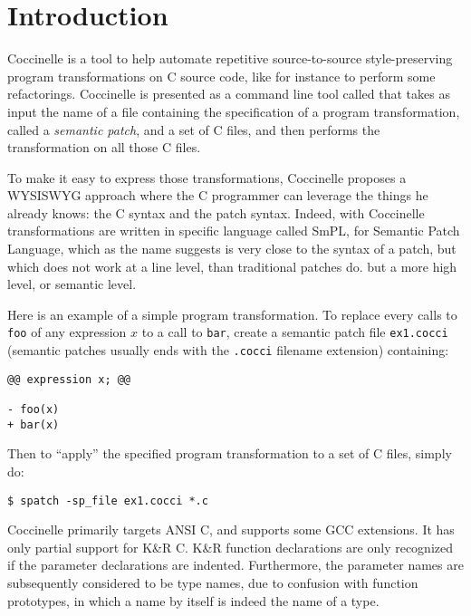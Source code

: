 \chapter{Introduction}

Coccinelle is a tool to help automate repetitive 
source-to-source style-preserving program transformations
on C source code, like for instance to perform some refactorings.
Coccinelle is presented as a command line tool called \spatch that takes
as input the name of a file containing the specification of a program
transformation, called a {\em semantic patch}, and a set of C files,
and then performs the transformation on all those C files.

To make it easy to express those transformations,
Coccinelle proposes a WYSISWYG approach where the C programmer 
can leverage the things he already knows: the C syntax
and the patch syntax. Indeed, with Coccinelle transformations
are written in specific language called SmPL, for 
Semantic Patch Language, which as the name suggests is very
close to the syntax of a patch, but which does not 
work at a line level, than traditional patches do.
but a more high level, or semantic level.

Here is an example of a simple program transformation.
To replace every calls to \verb+foo+ of any expression $x$ 
to a call to \verb+bar+, create a semantic patch file \verb+ex1.cocci+
(semantic patches usually ends with the \verb+.cocci+  filename extension)
containing:
\begin{verbatim}
@@ expression x; @@

- foo(x)
+ bar(x)

\end{verbatim}

Then to ``apply'' the specified program transformation to a set of C files,
simply do:
\begin{verbatim}
$ spatch -sp_file ex1.cocci *.c
\end{verbatim}


Coccinelle primarily targets ANSI C, and supports some GCC extensions.  It
has only partial support for K\&R C.  K\&R function declarations are only
recognized if the parameter declarations are indented.  Furthermore, the
parameter names are subsequently considered to be type names, due to
confusion with function prototypes, in which a name by itself is indeed the
name of a type.








